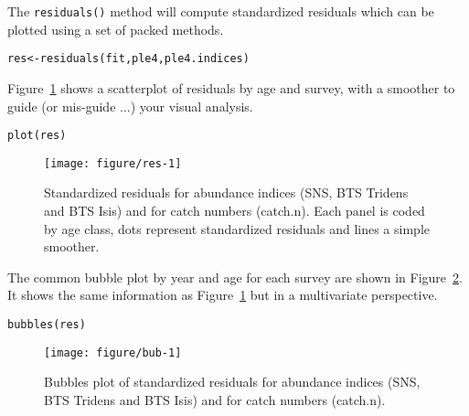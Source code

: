 \documentclass[a4paper,english,10pt]{article}\usepackage[]{graphicx}\usepackage[]{color}
\makeatletter
\def\maxwidth{ %
  \ifdim\Gin@nat@width>\linewidth
    \linewidth
  \else
    \Gin@nat@width
  \fi
}
\newcommand{\hlstd}[1]{\textcolor[rgb]{0,0,0}{#1}}%
\newcommand{\hlkwb}[1]{\textcolor[rgb]{0.361,0.506,0.596}{#1}}%
\newcommand{\hlkwd}[1]{\textcolor[rgb]{0.361,0.506,0.596}{#1}}%
\newenvironment{kframe}{%
 \def\at@end@of@kframe{}%
 \ifinner\ifhmode%
  \def\at@end@of@kframe{\end{minipage}}%
  \begin{minipage}{\columnwidth}%
 \fi\fi%
 \def\FrameCommand##1{\hskip\@totalleftmargin \hskip-\fboxsep
 \colorbox{shadecolor}{##1}\hskip-\fboxsep
     \hskip-\linewidth \hskip-\@totalleftmargin \hskip\columnwidth}%
 \MakeFramed {\advance\hsize-\width
   \@totalleftmargin\z@ \linewidth\hsize
   \@setminipage}}%
 {\par\unskip\endMakeFramed%
 \at@end@of@kframe}
\newenvironment{knitrout}{}{} %
\newcommand{\code}[1]{{\texttt{#1}}}
\makeatother
\begin{document}
The \code{residuals()} method will compute standardized residuals which can be plotted using a set of packed methods.

\begin{knitrout}
\color{fgcolor}\begin{kframe}
\begin{alltt}
\hlstd{res} \hlkwb{<-} \hlkwd{residuals}\hlstd{(fit, ple4, ple4.indices)}
\end{alltt}
\end{kframe}
\end{knitrout}

Figure~\ref{fig:res} shows a scatterplot of residuals by age and survey, with a smoother to guide (or mis-guide ...) your visual analysis.

\begin{knitrout}
\color{fgcolor}\begin{kframe}
\begin{alltt}
\hlkwd{plot}\hlstd{(res)}
\end{alltt}
\end{kframe}\begin{figure}[H]

{\centering \texttt{[image: figure/res-1]} 

}

\caption[Standardized residuals for abundance indices (SNS, BTS Tridens and BTS Isis) and for catch numbers (catch]{Standardized residuals for abundance indices (SNS, BTS Tridens and BTS Isis) and for catch numbers (catch.n). Each panel is coded by age class, dots represent standardized residuals and lines a simple smoother.}\label{fig:res}
\end{figure}


\end{knitrout}

The common bubble plot by year and age for each survey are shown in Figure~\ref{fig:bub}. It shows the same information as Figure~\ref{fig:res} but in a multivariate perspective.

\begin{knitrout}
\color{fgcolor}\begin{kframe}
\begin{alltt}
\hlkwd{bubbles}\hlstd{(res)}
\end{alltt}
\end{kframe}\begin{figure}[H]

{\centering \texttt{[image: figure/bub-1]} 

}

\caption[Bubbles plot of standardized residuals for abundance indices (SNS, BTS Tridens and BTS Isis) and for catch numbers (catch]{Bubbles plot of standardized residuals for abundance indices (SNS, BTS Tridens and BTS Isis) and for catch numbers (catch.n).}\label{fig:bub}
\end{figure}


\end{knitrout}
\end{document}
